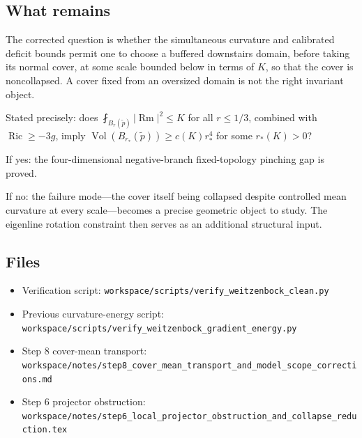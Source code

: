\subsection{What remains}
The corrected question is whether the simultaneous curvature and calibrated
deficit bounds permit one to choose a buffered downstairs domain, before
taking its normal cover, at some scale bounded below in terms of $K$, so that
the cover is noncollapsed.  A cover fixed from an oversized domain is not the
right invariant object.

Stated precisely: does $\fint_{B_r(\tilde p)}|\operatorname{Rm}|^2 \le K$
for all $r \le 1/3$, combined with $\operatorname{Ric}\ge -3g$,
imply $\operatorname{Vol}(B_{r_*}(\tilde p)) \ge c(K)r_*^4$
for some $r_*(K) > 0$?

If yes: the four-dimensional negative-branch fixed-topology pinching
gap is proved.

If no: the failure mode---the cover itself being collapsed despite
controlled mean curvature at every scale---becomes a precise
geometric object to study. The eigenline rotation constraint
then serves as an additional structural input.

\subsection{Files}
\begin{itemize}
\item Verification script: \texttt{workspace/scripts/verify\_weitzenbock\_clean.py}
\item Previous curvature-energy script: \texttt{workspace/scripts/verify\_weitzenbock\_gradient\_energy.py}
\item Step 8 cover-mean transport: \texttt{workspace/notes/step8\_cover\_mean\_transport\_and\_model\_scope\_corrections.md}
\item Step 6 projector obstruction: \texttt{workspace/notes/step6\_local\_projector\_obstruction\_and\_collapse\_reduction.tex}
\end{itemize}
